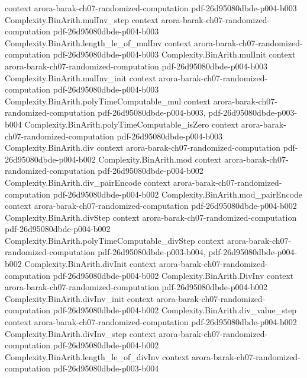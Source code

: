 \begin{theorem}
  {context}
  {arora-barak-ch07-randomized-computation}
  {pdf-26d95080dbde-p004-b003}
\proofstep
  {Complexity.BinArith.mulInv_step}
  {context}
  {arora-barak-ch07-randomized-computation}
  {pdf-26d95080dbde-p004-b003}
\proofstep
  {Complexity.BinArith.length_le_of_mulInv}
  {context}
  {arora-barak-ch07-randomized-computation}
  {pdf-26d95080dbde-p004-b003}
\proofstep
  {Complexity.BinArith.mulInit}
  {context}
  {arora-barak-ch07-randomized-computation}
  {pdf-26d95080dbde-p004-b003}
\proofstep
  {Complexity.BinArith.mulInv_init}
  {context}
  {arora-barak-ch07-randomized-computation}
  {pdf-26d95080dbde-p004-b003}
\proofstep
  {Complexity.BinArith.polyTimeComputable_mul}
  {context}
  {arora-barak-ch07-randomized-computation}
  {pdf-26d95080dbde-p004-b003,
    pdf-26d95080dbde-p003-b004}
\proofstep
  {Complexity.BinArith.polyTimeComputable_isZero}
  {context}
  {arora-barak-ch07-randomized-computation}
  {pdf-26d95080dbde-p004-b003}
\proofstep
  {Complexity.BinArith.div}
  {context}
  {arora-barak-ch07-randomized-computation}
  {pdf-26d95080dbde-p004-b002}
\proofstep
  {Complexity.BinArith.mod}
  {context}
  {arora-barak-ch07-randomized-computation}
  {pdf-26d95080dbde-p004-b002}
\proofstep
  {Complexity.BinArith.div_pairEncode}
  {context}
  {arora-barak-ch07-randomized-computation}
  {pdf-26d95080dbde-p004-b002}
\proofstep
  {Complexity.BinArith.mod_pairEncode}
  {context}
  {arora-barak-ch07-randomized-computation}
  {pdf-26d95080dbde-p004-b002}
\proofstep
  {Complexity.BinArith.divStep}
  {context}
  {arora-barak-ch07-randomized-computation}
  {pdf-26d95080dbde-p004-b002}
\proofstep
  {Complexity.BinArith.polyTimeComputable_divStep}
  {context}
  {arora-barak-ch07-randomized-computation}
  {pdf-26d95080dbde-p003-b004,
    pdf-26d95080dbde-p004-b002}
\proofstep
  {Complexity.BinArith.divInit}
  {context}
  {arora-barak-ch07-randomized-computation}
  {pdf-26d95080dbde-p004-b002}
\proofstep
  {Complexity.BinArith.DivInv}
  {context}
  {arora-barak-ch07-randomized-computation}
  {pdf-26d95080dbde-p004-b002}
\proofstep
  {Complexity.BinArith.divInv_init}
  {context}
  {arora-barak-ch07-randomized-computation}
  {pdf-26d95080dbde-p004-b002}
\proofstep
  {Complexity.BinArith.div_value_step}
  {context}
  {arora-barak-ch07-randomized-computation}
  {pdf-26d95080dbde-p004-b002}
\proofstep
  {Complexity.BinArith.divInv_step}
  {context}
  {arora-barak-ch07-randomized-computation}
  {pdf-26d95080dbde-p004-b002}
\proofstep
  {Complexity.BinArith.length_le_of_divInv}
  {context}
  {arora-barak-ch07-randomized-computation}
  {pdf-26d95080dbde-p003-b004}
\proofstep

\end{theorem}
